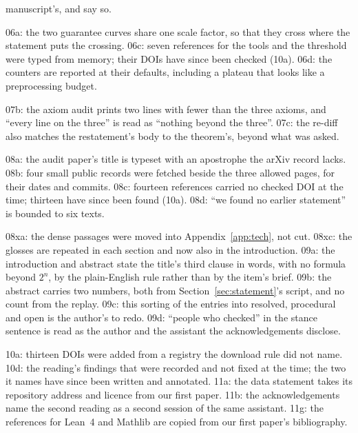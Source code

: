 \begin{description}
  manuscript's, and say so.
\item[For the practitioner (Section~\ref{sec:practitioner}).] 06a: the
  two guarantee curves share one scale factor, so that they cross where
  the statement puts the crossing. 06c: seven references for the tools
  and the threshold were typed from memory; their DOIs have since been
  checked (10a). 06d: the counters are reported at their defaults,
  including a plateau that looks like a preprocessing budget.
\item[Our Lean (Section~\ref{sec:lean}).] 07b: the axiom audit prints
  two lines with fewer than the three axioms, and ``every line on the
  three'' is read as ``nothing beyond the three''. 07c: the re-diff also
  matches the restatement's body to the theorem's, beyond what was
  asked.
\item[Related work (Section~\ref{sec:related}).] 08a: the audit paper's
  title is typeset with an apostrophe the arXiv record lacks. 08b: four
  small public records were fetched beside the three allowed pages, for
  their dates and commits. 08c: fourteen references carried no checked
  DOI at the time; thirteen have since been found (10a). 08d: ``we
  found no earlier statement'' is bounded to six texts.
\item[Plain English, and this section.] 08xa: the dense passages were
  moved into Appendix~\ref{app:tech}, not cut. 08xc: the glosses are
  repeated in each section and now also in the introduction. 09a: the
  introduction and abstract state the title's third clause in words,
  with no formula beyond $2^n$, by the plain-English rule rather than
  by the item's brief. 09b: the abstract carries two numbers, both from
  Section~\ref{sec:statement}'s script, and no count from the replay.
  09c: this sorting of the entries into resolved, procedural and open
  is the author's to redo. 09d: ``people who checked'' in the stance
  sentence is read as the author and the assistant the acknowledgements
  disclose.
\item[The write-up around the paper.] 10a: thirteen DOIs were added
  from a registry the download rule did not name. 10d: the reading's
  findings that were recorded and not fixed at the time; the two it
  names have since been written and annotated. 11a: the data statement
  takes its repository address and licence from our first paper. 11b:
  the acknowledgements name the second reading as a second session of
  the same assistant. 11g: the references for Lean~4 and Mathlib are
  copied from our first paper's bibliography.
\end{description}

